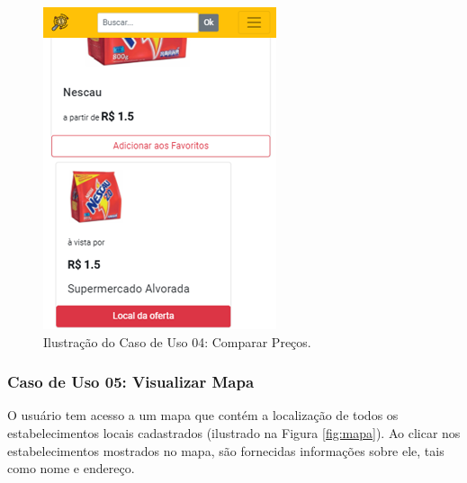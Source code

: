 \begin{figure}[H]
\centering
\includegraphics[width=\linewidth]{figuras/tela-comparar.png}
\caption{Ilustração do Caso de Uso 04: Comparar Preços.}
\label{fig:comparar}
\end{figure}

\subsubsection{Caso de Uso 05: Visualizar Mapa}

O usuário tem acesso a um mapa que contém a localização de todos os estabelecimentos locais cadastrados (ilustrado na Figura \ref{fig:mapa}). Ao clicar nos estabelecimentos mostrados no mapa, são fornecidas informações sobre ele, tais como nome e endereço.

